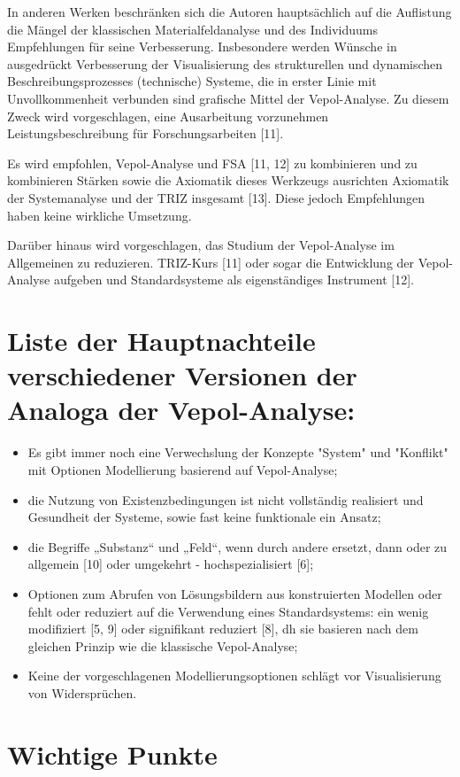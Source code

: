 \documentclass[11pt,a4paper]{article}
\begin{document}
In anderen Werken beschränken sich die Autoren hauptsächlich auf die
Auflistung die Mängel der klassischen Materialfeldanalyse und des Individuums
Empfehlungen für seine Verbesserung. Insbesondere werden Wünsche in
ausgedrückt Verbesserung der Visualisierung des strukturellen und dynamischen
Beschreibungsprozesses (technische) Systeme, die in erster Linie mit
Unvollkommenheit verbunden sind grafische Mittel der Vepol-Analyse. Zu diesem
Zweck wird vorgeschlagen, eine Ausarbeitung vorzunehmen Leistungsbeschreibung
für Forschungsarbeiten [11].

Es wird empfohlen, Vepol-Analyse und FSA [11, 12] zu kombinieren und zu
kombinieren Stärken sowie die Axiomatik dieses Werkzeugs ausrichten Axiomatik
der Systemanalyse und der TRIZ insgesamt [13]. Diese jedoch Empfehlungen haben
keine wirkliche Umsetzung.

Darüber hinaus wird vorgeschlagen, das Studium der Vepol-Analyse im
Allgemeinen zu reduzieren.  TRIZ-Kurs [11] oder sogar die Entwicklung der
Vepol-Analyse aufgeben und Standardsysteme als eigenständiges Instrument [12].

\section*{Liste der Hauptnachteile verschiedener Versionen der Analoga der
  Vepol-Analyse:}
\begin{itemize}
\item Es gibt immer noch eine Verwechslung der Konzepte "System" und
  "Konflikt" mit Optionen Modellierung basierend auf Vepol-Analyse;
\item
  die Nutzung von Existenzbedingungen ist nicht vollständig realisiert und
  Gesundheit der Systeme, sowie fast keine funktionale ein Ansatz;
\item
  die Begriffe „Substanz“ und „Feld“, wenn durch andere ersetzt, dann oder zu
  allgemein [10] oder umgekehrt - hochspezialisiert [6];
\item
  Optionen zum Abrufen von Lösungsbildern aus konstruierten Modellen oder
  fehlt oder reduziert auf die Verwendung eines Standardsystems: ein wenig
  modifiziert [5, 9] oder signifikant reduziert [8], dh sie basieren nach dem
  gleichen Prinzip wie die klassische Vepol-Analyse;
\item
  Keine der vorgeschlagenen Modellierungsoptionen schlägt vor Visualisierung
  von Widersprüchen.
\end{itemize}

\section*{Wichtige Punkte}
\end{document}
